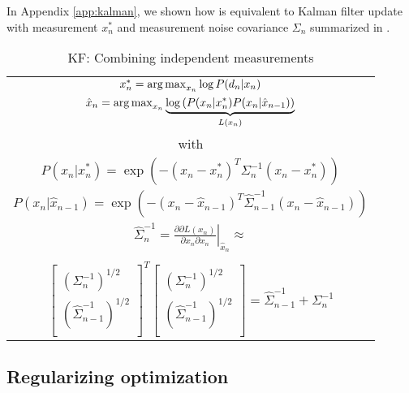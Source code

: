 In Appendix \ref{app:kalman}, we shown how  is equivalent to Kalman filter update with measurement $x_n^*$ and measurement noise covariance $\Sigma_n$ summarized in .


\begin{table}[ht] 
\centering
\caption{KF: Combining independent measurements\label{tab:kf-like}} 
\begin{tabular}{|c|}
\hline
$x_n^* = \operatorname*{arg\,max}_{x_n} \log P(d_n|x_n)$ \\
$\hat{x}_n = \operatorname*{arg\,max}_{x_n} \underbrace{\log \left( P(x_n|x_n^*) P(x_n |\hat{x}_{n - 1}) \right)}_{L(x_n)}$\\
with \\
$P(x_n |x_n^*) = \exp \left( - (x_n - x_n^* )^T \Sigma_n^{-1}(x_n - x_n^* )\right)$ \\
$P(x_n |\hat{x}_{n - 1}) = \exp \left( - (x_n - \hat{x}_{n - 1} )^T \hat{\Sigma}_{n - 1}^{-1} (x_n - \hat{x}_{n - 1} )\right)$ \\	

$\hat{\Sigma}_n^{-1} = \left. \tfrac{\partial \partial L(x_n)}{\partial x_n \partial x_n}\right|_{\hat{x}_n} \approx $ \\
\\
$\left[
	\begin{array}{cc}
		\left(\Sigma_n^{-1}\right)^{1/2} \\
		\left(\hat{\Sigma}_{n - 1}^{-1}\right)^{1/2} \\
	\end{array}
\right]^T 
\left[
	\begin{array}{c}
		\left(\Sigma_n^{-1}\right)^{1/2} \\
		\left(\hat{\Sigma}_{n - 1}^{-1}\right)^{1/2} \\
	\end{array}
\right] = \hat{\Sigma}_{n-1}^{-1}  + \Sigma_{n}^{-1}$ \\

\hline
\end{tabular}
\end{table}

\subsection{Regularizing optimization}

